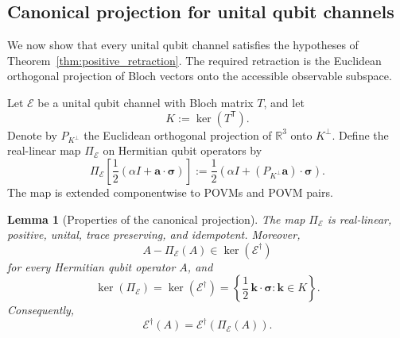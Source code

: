 \documentclass[
aps,pra,twocolumn,10pt,
superscriptaddress,longbibliography,floatfix
]{revtex4-2}
\newtheorem{lemma}[theorem]{Lemma}
\begin{document}
\subsection{Canonical projection for unital qubit channels}
\label{sec:canonical}

We now show that every unital qubit channel satisfies the hypotheses of Theorem~\ref{thm:positive_retraction}. The required retraction is the Euclidean orthogonal projection of Bloch vectors onto the accessible observable subspace.

Let $\mathcal E$ be a unital qubit channel with Bloch matrix $T$, and let
\[
K:=\ker(T^{\mathsf T}).
\]
Denote by $P_{K^\perp}$ the Euclidean orthogonal projection of $\mathbb R^3$ onto $K^\perp$. Define the real-linear map $\Pi_{\mathcal E}$ on Hermitian qubit operators by
\begin{equation}
\Pi_{\mathcal E}\!\left[
\frac12
\left(
\alpha I+\mathbf a\cdot\boldsymbol\sigma
\right)
\right]
:=
\frac12
\left(
\alpha I+
(P_{K^\perp}\mathbf a)\cdot\boldsymbol\sigma
\right).
\label{eq:canonical_qubit_projection}
\end{equation}
The map is extended componentwise to POVMs and POVM pairs.

\begin{lemma}[Properties of the canonical projection]
\label{lem:canonical_projection}
The map $\Pi_{\mathcal E}$ is real-linear, positive, unital, trace preserving, and idempotent. Moreover,
\begin{equation}
A-\Pi_{\mathcal E}(A)
\in\ker(\mathcal E^\dagger)
\label{eq:projection_kernel_difference}
\end{equation}
for every Hermitian qubit operator $A$, and
\begin{equation}
\ker(\Pi_{\mathcal E})
=
\ker(\mathcal E^\dagger)
=
\left\{
\frac12\,\mathbf k\cdot\boldsymbol\sigma:
\mathbf k\in K
\right\}.
\label{eq:projection_kernel_equality}
\end{equation}
Consequently,
\[
\mathcal E^\dagger(A)
=
\mathcal E^\dagger(\Pi_{\mathcal E}(A)).
\]
\end{lemma}
\end{document}
